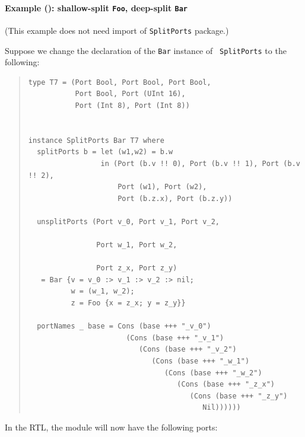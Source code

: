 
\paragraph{Example (\BH): shallow-split {\tt Foo}, deep-split {\tt Bar}}

\label{sec:splitports_examples_BH_Foo_Shallow_Bar_Deep}

\hspace*{1em}

{\footnotesize (This example does not need import of {\tt SplitPorts} package.)}

Suppose we change the declaration of the {\tt Bar} instance of {\tt
SplitPorts} to the following:

\begin{quote}
\begin{verbatim}
type T7 = (Port Bool, Port Bool, Port Bool,
           Port Bool, Port (UInt 16),
           Port (Int 8), Port (Int 8))


instance SplitPorts Bar T7 where
  splitPorts b = let (w1,w2) = b.w
                 in (Port (b.v !! 0), Port (b.v !! 1), Port (b.v !! 2),
                     Port (w1), Port (w2),
                     Port (b.z.x), Port (b.z.y))

  unsplitPorts (Port v_0, Port v_1, Port v_2,
                
                Port w_1, Port w_2,
                
                Port z_x, Port z_y)
   = Bar {v = v_0 :> v_1 :> v_2 :> nil;
          w = (w_1, w_2);
          z = Foo {x = z_x; y = z_y}}

  portNames _ base = Cons (base +++ "_v_0")
                       (Cons (base +++ "_v_1")
                          (Cons (base +++ "_v_2")
                             (Cons (base +++ "_w_1")
                                (Cons (base +++ "_w_2")
                                   (Cons (base +++ "_z_x")
                                      (Cons (base +++ "_z_y")
                                         Nil))))))
\end{verbatim}
\end{quote}

In the RTL, the module will now have the following ports:

